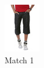 \begin{figure}[H]
\begin{subfigure}[b]{0.19\textwidth}
        \includegraphics[width=\textwidth]{images/output3.jpeg}
        \caption{Match 1}
    \end{subfigure}
    \begin{subfigure}[b]{0.19\textwidth}

\end{subfigure}
\end{figure}
